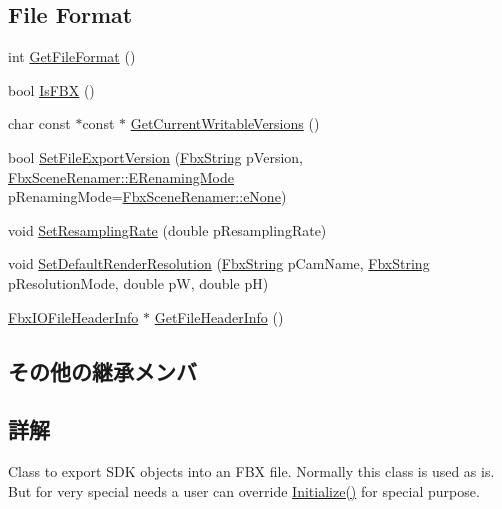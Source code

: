 \subsection*{File Format}
\begin{DoxyCompactItemize}
\item 
int \hyperlink{class_fbx_exporter_abd4308d309fb09113ebe6d7828691505}{Get\+File\+Format} ()
\item 
bool \hyperlink{class_fbx_exporter_a1a304c76e28c89212d8eee1b6f791c38}{Is\+F\+BX} ()
\item 
char const  $\ast$const  $\ast$ \hyperlink{class_fbx_exporter_a06229d56de47b83aec05e7c150f66264}{Get\+Current\+Writable\+Versions} ()
\item 
bool \hyperlink{class_fbx_exporter_a165c1e0111a8770be2bea86043db5a46}{Set\+File\+Export\+Version} (\hyperlink{class_fbx_string}{Fbx\+String} p\+Version, \hyperlink{class_fbx_scene_renamer_a9279ee1a645d6499b934adbc376f8678}{Fbx\+Scene\+Renamer\+::\+E\+Renaming\+Mode} p\+Renaming\+Mode=\hyperlink{class_fbx_scene_renamer_a9279ee1a645d6499b934adbc376f8678a6530ea605d82bb5be39517b65b47048e}{Fbx\+Scene\+Renamer\+::e\+None})
\item 
void \hyperlink{class_fbx_exporter_aeea95b702891fa350a03ab3e9aa949e1}{Set\+Resampling\+Rate} (double p\+Resampling\+Rate)
\item 
void \hyperlink{class_fbx_exporter_a4099cedc5a69045761b6fb6acd561bbf}{Set\+Default\+Render\+Resolution} (\hyperlink{class_fbx_string}{Fbx\+String} p\+Cam\+Name, \hyperlink{class_fbx_string}{Fbx\+String} p\+Resolution\+Mode, double pW, double pH)
\item 
\hyperlink{class_fbx_i_o_file_header_info}{Fbx\+I\+O\+File\+Header\+Info} $\ast$ \hyperlink{class_fbx_exporter_a9b219b2318ec3e5949a03b47e939251a}{Get\+File\+Header\+Info} ()
\end{DoxyCompactItemize}
\subsection*{その他の継承メンバ}


\subsection{詳解}
Class to export S\+DK objects into an F\+BX file. Normally this class is used as is. But for very special needs a user can override \hyperlink{class_fbx_exporter_acab60199145f0c86b80fac8ed7e1b239}{Initialize()} for special purpose.

